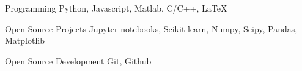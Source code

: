 
\begin{cvskills}

  \cvskill
    {Programming} %
    {Python, Javascript, Matlab, C/C++, LaTeX} %

  \cvskill
    {Open Source Projects}
    {Jupyter notebooks, Scikit-learn, Numpy, Scipy, Pandas, Matplotlib}

  \cvskill
    {Open Source Development}
    {Git, Github}

\end{cvskills}
